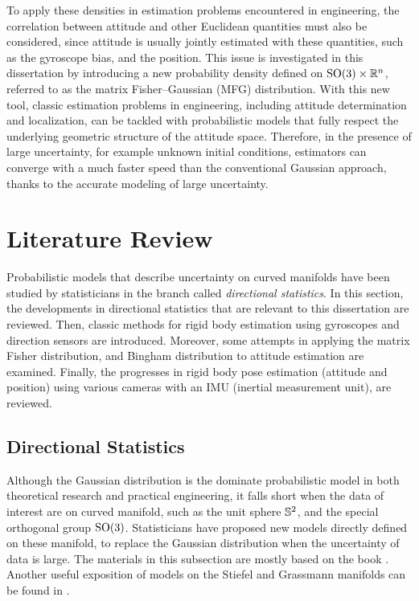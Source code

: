 To apply these densities in estimation problems encountered in engineering, the correlation between attitude and other Euclidean quantities must also be considered, since attitude is usually jointly estimated with these quantities, such as the gyroscope bias, and the position.
This issue is investigated in this dissertation by introducing a new probability density defined on $\mathrm{SO}(3) \times \mathbb{R}^n$, referred to as the matrix Fisher--Gaussian (MFG) distribution.
With this new tool, classic estimation problems in engineering, including attitude determination and localization, can be tackled with probabilistic models that fully respect the underlying geometric structure of the attitude space.
Therefore, in the presence of large uncertainty, for example unknown initial conditions, estimators can converge with a much faster speed than the conventional Gaussian approach, thanks to the accurate modeling of large uncertainty.

\section{Literature Review}

Probabilistic models that describe uncertainty on curved manifolds have been studied by statisticians in the branch called \textit{directional statistics}.
In this section, the developments in directional statistics that are relevant to this dissertation are reviewed.
Then, classic methods for rigid body estimation using gyroscopes and direction sensors are introduced.
Moreover, some attempts in applying the matrix Fisher distribution, and Bingham distribution to attitude estimation are examined.
Finally, the progresses in rigid body pose estimation (attitude and position) using various cameras with an IMU (inertial measurement unit), are reviewed.

\subsection{Directional Statistics} \label{section:intro-review-direction}

Although the Gaussian distribution is the dominate probabilistic model in both theoretical research and practical engineering, it falls short when the data of interest are on curved manifold, such as the unit sphere $\mathbb{S}^2$, and the special orthogonal group $\mathrm{SO}(3)$.
Statisticians have proposed new models directly defined on these manifold, to replace the Gaussian distribution when the uncertainty of data is large.
The materials in this subsection are mostly based on the book \cite{mardia2009directional}.
Another useful exposition of models on the Stiefel and Grassmann manifolds can be found in \cite{chikuse2003statistics}.

